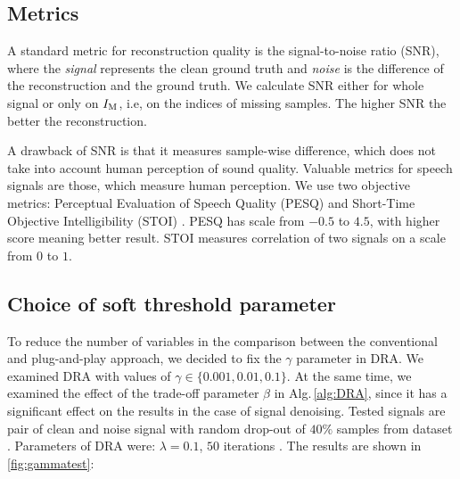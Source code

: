 \documentclass[conference]{IEEEtran}
\newcommand{\todo}[1]{\textcolor{red}{#1}}
\begin{document}
\subsection{Metrics}\label{subsec:metrics}


A standard metric for reconstruction quality is the signal-to-noise ratio (SNR), where the \textit{signal} represents the clean ground truth and \textit{noise} is the difference of the reconstruction and the ground truth.
We calculate SNR either for whole signal or only on $I_\textup{M}$, i.e, on the indices of missing samples.
The higher SNR the better the reconstruction.

A drawback of SNR is that it measures sample-wise difference, which does not take into account human perception of sound quality.
Valuable metrics for speech signals are those, which measure human perception.
We use two objective metrics: Perceptual Evaluation of Speech Quality (PESQ) \cite{Rix2001} and 
Short-Time Objective Intelligibility (STOI) \cite{Taal2010}.
PESQ has scale from $-0.5$ to $4.5$, with higher score meaning better result.
STOI measures correlation of two signals on a scale from $0$ to $1$.

\subsection{Choice of soft threshold parameter}\label{subsec:soft_thresh}

To reduce the number of variables in the comparison between the conventional and plug-and-play approach, we decided to fix the $\gamma$ parameter in DRA.
We examined DRA with values of $\gamma\in\{0.001, 0.01,0.1\}$.
At the same time, we examined the effect of the trade-off parameter $\beta$ in Alg.\,\ref{alg:DRA}, since it has a significant effect on the results in the case of signal denoising. 
Tested signals are pair of clean and noise signal with random drop-out of $40\%$ samples from dataset \cite{ValentiniBotinhao2017}.
Parameters of DRA were: $\lambda=0.1$, $50$ iterations .
The results are shown in \ref{fig:gammatest}:
\end{document}
